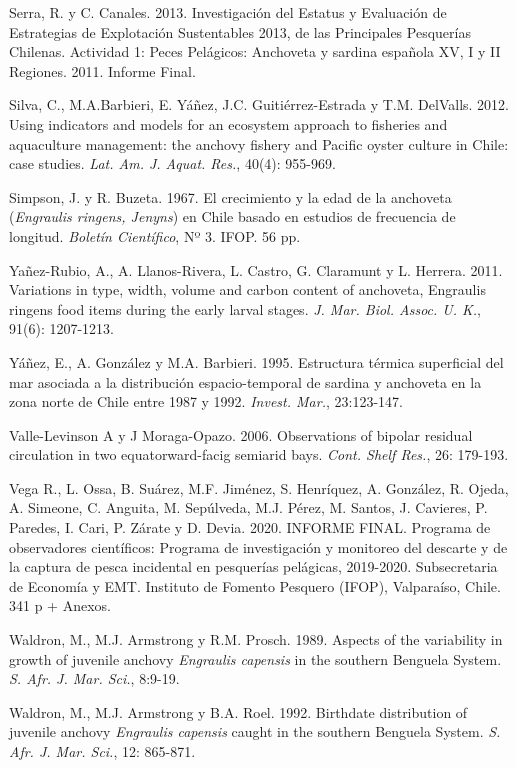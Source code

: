 \documentclass[letter,11pt]{article}
\begin{document}
Serra, R. y C. Canales. 2013. Investigaci\'on del Estatus y Evaluaci\'on de
Estrategias de Explotaci\'on Sustentables 2013, de las Principales
Pesquer\'ias Chilenas. Actividad 1: Peces Pel\'agicos: Anchoveta y sardina
espa\~{n}ola XV, I y II Regiones. 2011. Informe Final.

Silva, C., M.A.Barbieri, E. Y\'a\~{n}ez, J.C. Guiti\'errez-Estrada y T.M.
DelValls. 2012. Using indicators and models for an ecosystem approach to
fisheries and aquaculture management: the anchovy fishery and Pacific
oyster culture in Chile: case studies. \textit{Lat. Am. J. Aquat. Res.},
40(4): 955-969.

Simpson, J. y R. Buzeta. 1967. El crecimiento y la edad de la anchoveta
(\textit{Engraulis ringens, Jenyns}) en Chile basado en estudios de
frecuencia de longitud. \textit{Bolet\'in Cient\'ifico}, Nº 3. IFOP. 56 pp.

Ya\~{n}ez-Rubio, A., A. Llanos-Rivera, L. Castro, G. Claramunt y L. Herrera.
2011. Variations in type, width, volume and carbon content of anchoveta,
Engraulis ringens food items during the early larval stages.
\textit{J. Mar. Biol. Assoc. U. K.}, 91(6): 1207-1213.

Y\'a\~{n}ez, E., A. Gonz\'alez y M.A. Barbieri. 1995. Estructura t\'ermica
superficial del mar asociada a la distribuci\'on espacio-temporal de
sardina y anchoveta en la zona norte de Chile entre 1987 y 1992.
\textit{Invest. Mar.}, 23:123-147.

Valle-Levinson A y J Moraga-Opazo. 2006. Observations of bipolar
residual circulation in two equatorward-facig semiarid bays.
\textit{Cont. Shelf Res.}, 26: 179-193.

Vega R., L. Ossa, B. Su\'arez, M.F. Jim\'enez, S. Henr\'iquez, A. Gonz\'alez, R. Ojeda, A.
Simeone, C. Anguita, M. Sep\'ulveda, M.J. P\'erez, M. Santos, J. Cavieres, P. Paredes,
I. Cari, P. Z\'arate y D. Devia. 2020. INFORME FINAL. Programa de
observadores cient\'ificos: Programa de investigaci\'on y monitoreo del
descarte y de la captura de pesca incidental en pesquer\'ias pel\'agicas,
2019-2020. Subsecretaria de Econom\'ia y EMT. Instituto de Fomento Pesquero
(IFOP), Valpara\'iso, Chile. 341 p + Anexos.

Waldron, M., M.J. Armstrong y R.M. Prosch. 1989. Aspects of the
variability in growth of juvenile anchovy \textit{Engraulis capensis} in
the southern Benguela System. \textit{S. Afr. J. Mar. Sci.}, 8:9-19.

Waldron, M., M.J. Armstrong y B.A. Roel. 1992. Birthdate distribution of
juvenile anchovy \textit{Engraulis capensis} caught in the southern
Benguela System. \textit{S. Afr. J. Mar. Sci.}, 12: 865-871.
\end{document}

